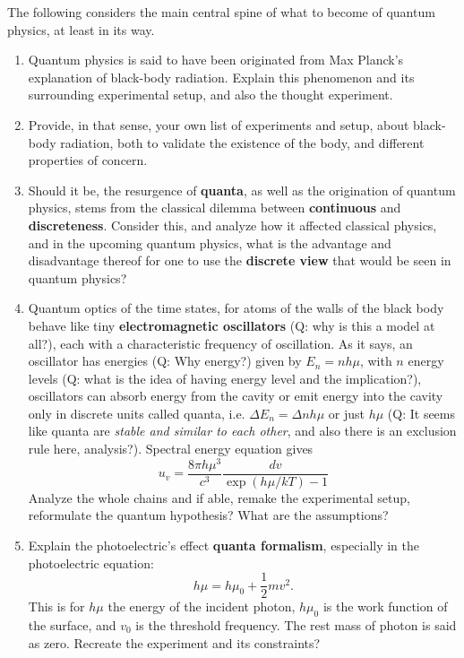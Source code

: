 \documentclass[10pt]{article}
\begin{document}
The following considers the main central spine of what to become of quantum physics, at least in its way. 
\begin{enumerate}[itemsep=1pt,topsep=1pt]
  \item Quantum physics is said to have been originated from Max Planck's explanation of black-body radiation. Explain this phenomenon and its surrounding experimental setup, and also the thought experiment. 
  \item Provide, in that sense, your own list of experiments and setup, about black-body radiation, both to validate the existence of the body, and different properties of concern. 
  \item Should it be, the resurgence of \textbf{quanta}, as well as the origination of quantum physics, stems from the classical dilemma between \textbf{continuous} and \textbf{discreteness}. Consider this, and analyze how it affected classical physics, and in the upcoming quantum physics, what is the advantage and disadvantage thereof for one to use the \textbf{discrete view} that would be seen in quantum physics? 
  \item Quantum optics of the time states, for atoms of the walls of the black body behave like tiny \textbf{electromagnetic oscillators} (Q: why is this a model at all?), each with a characteristic frequency of oscillation. As it says, an oscillator has energies (Q: Why energy?) given by $E_{n}=n h \mu$, with $n$ energy levels (Q: what is the idea of having energy level and the implication?), oscillators can absorb energy from the cavity or emit energy into the cavity only in discrete units called quanta, i.e. $\Delta E_{n}=\Delta n h \mu$ or just $h\mu$ (Q: It seems like quanta are \textit{stable and similar to each other}, and also there is an exclusion rule here, analysis?). Spectral energy equation gives \begin{equation}
    u_{v} = \frac{8\pi h\mu^{3}}{c^{3}} \frac{dv}{\exp{\left(h\mu /kT\right)}-1}
  \end{equation} 
  Analyze the whole chains and if able, remake the experimental setup, reformulate the quantum hypothesis? What are the assumptions? 
  \item Explain the photoelectric's effect \textbf{quanta formalism}, especially in the photoelectric equation: 
  \begin{equation}
    h\mu = h\mu_{0} + \frac{1}{2} mv^{2}.
  \end{equation}
  This is for $h\mu$ the energy of the incident photon, $h\mu_{0}$ is the work function of the surface, and $v_{0}$ is the threshold frequency. The rest mass of photon is said as zero. Recreate the experiment and its constraints? 

\end{enumerate}
\end{document}
